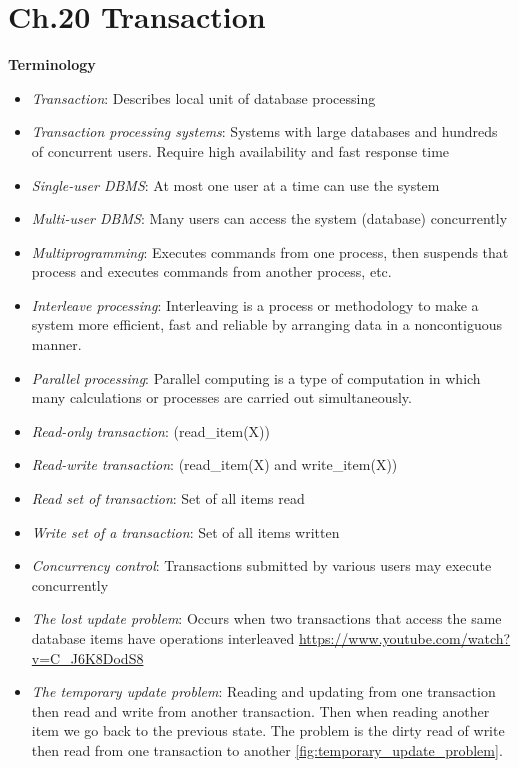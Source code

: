 \documentclass{article}
\begin{document}
\section{Ch.20 Transaction}
\textbf{Terminology}
\begin{itemize}
    \item \textit{Transaction}: Describes local unit of database processing
    \item \textit{Transaction processing systems}: Systems with large databases and hundreds of concurrent users. Require high availability and fast response time
    \item \textit{Single-user DBMS}: At most one user at a time can use the system
    \item \textit{Multi-user DBMS}: Many users can access the system (database) concurrently
    \item \textit{Multiprogramming}: Executes commands from one process, then suspends that process and executes commands from another process, etc.
    \item \textit{Interleave processing}: Interleaving is a process or methodology to make a system more efficient, fast and reliable by arranging data in a noncontiguous manner.
    \item \textit{Parallel processing}: Parallel computing is a type of computation in which many calculations or processes are carried out simultaneously.
    \item \textit{Read-only transaction}: (read\_item(X))
    \item \textit{Read-write transaction}: (read\_item(X) and write\_item(X))
    \item \textit{Read set of transaction}: Set of all items read
    \item \textit{Write set of a transaction}: Set of all items written
    \item \textit{Concurrency control}: Transactions submitted by various users may execute concurrently
    \item \textit{The lost update problem}: Occurs when two transactions that access the same database items have operations interleaved
    \url{https://www.youtube.com/watch?v=C_J6K8DodS8}
    \item \textit{The temporary update problem}: Reading and updating from one transaction then read and write from another transaction. Then when reading another item we go back to the previous state. The problem is the dirty read of write then read from one transaction to another \ref{fig:temporary_update_problem}. 

\end{itemize}
\end{document}
